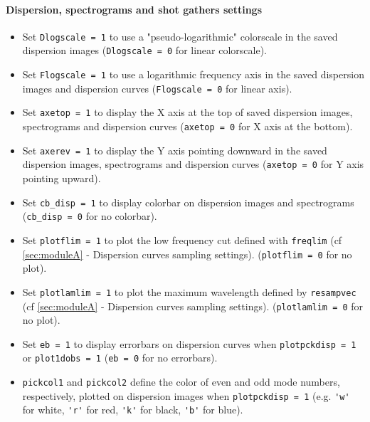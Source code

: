 \documentclass[twoside,a4paper]{article}
\begin{document}
\paragraph{Dispersion, spectrograms and shot gathers settings}
\begin{itemize}[leftmargin=*]
\setlength\itemsep{2ex}
\item Set \verb|Dlogscale = 1| to use a "pseudo-logarithmic" colorscale in the saved dispersion images (\verb|Dlogscale = 0| for linear colorscale).

\item Set \verb|Flogscale = 1| to use a logarithmic frequency axis in the saved dispersion images and dispersion curves (\verb|Flogscale = 0| for linear axis).

\item Set \verb|axetop = 1| to display the X axis at the top of saved dispersion images, spectrograms and dispersion curves (\verb|axetop = 0| for X axis at the bottom).

\item Set \verb|axerev = 1| to display the Y axis pointing downward in the saved dispersion images, spectrograms and dispersion curves (\verb|axetop = 0| for Y axis pointing upward).

\item Set \verb|cb_disp = 1| to display colorbar on dispersion images and spectrograms (\verb|cb_disp = 0| for no colorbar).

\item Set \verb|plotflim = 1| to plot the low frequency cut defined with \verb|freqlim| (cf \ref{sec:moduleA} - Dispersion curves sampling settings). (\verb|plotflim = 0| for no plot).

\item Set \verb|plotlamlim = 1| to plot the maximum wavelength defined by \verb|resampvec| (cf \ref{sec:moduleA} - Dispersion curves sampling settings). (\verb|plotlamlim = 0| for no plot).

\item Set \verb|eb = 1| to display errorbars on dispersion curves when \verb|plotpckdisp = 1| or \verb|plot1dobs = 1| (\verb|eb = 0| for no errorbars).

\item \verb|pickcol1| and \verb|pickcol2| define the color of even and odd mode numbers, respectively, plotted on dispersion images when \verb|plotpckdisp = 1| (e.g. \verb|'w'| for white, \verb|'r'| for red, \verb|'k'| for black, \verb|'b'| for blue).\\[2ex]


\end{itemize}
\end{document}
